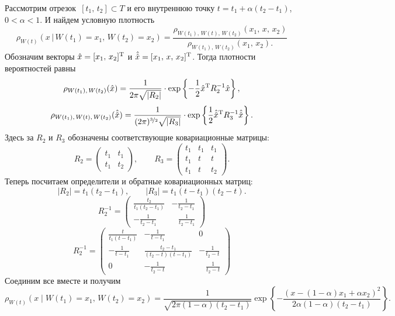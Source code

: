 Рассмотрим отрезок~$[t_1,\,t_2] \subset T$ и его внутреннюю точку $t = t_1 + \alpha(t_2 - t_1)$, $0 < \alpha < 1$. И найдем условную плотность
$$
        \rho_{W(t)}(x\,|\,W(t_1) = x_1,\, W(t_2) = x_2)
=
        \frac{
\rho_{W(t_1),\,W(t),\,W(t_2)}(x_1,\,x,\,x_2)
        }{
\rho_{W(t_1),\,W(t_2)}(x_1,\,x_2).
        }
$$
Обозначим векторы $\hat x = [x_1,\,x_2]^{\mathrm{T}}$ и $\hat{\hat x} = [x_1,\,x,\,x_2]^{\mathrm{T}}$. Тогда плотности вероятностей равны
$$
        \rho_{W(t_1),\,W(t_2)}(\hat x)
=
        \frac{1}{2\pi\sqrt{|R_2|}}\cdot \exp\left\{-\frac12 \hat x^{\mathrm{T}} R_2^{-1} \hat x\right\},
$$
$$
        \rho_{W(t_1),\,W(t),\,W(t_2)}(\hat{\hat x}) = \frac{1}{(2\pi)^{\nicefrac{3}{2}}\sqrt{|R_3|}}\cdot\exp\left\{\frac12 \hat{\hat x}^{\mathrm{T}} R_3^{-1}\hat{\hat x}\right\}.
$$
Здесь за $R_2$ и $R_3$ обозначены соответствующие ковариационные матрицы:
$$
        R_2 = \begin{pmatrix}
        t_1 & t_1 \\
        t_1 & t_2
        \end{pmatrix},
        \qquad
        R_3 = \begin{pmatrix}
                t_1 & t_1 & t_1 \\
                t_1 & t   & t   \\
                t_1 & t   & t_2
        \end{pmatrix}
        .
$$
Теперь посчитаем определители и обратные ковариационных матриц:
$$
        |R_2|
=
        t_1
        (t_2 - t_1),
\qquad
        |R_3|
=
        t_1
        (t - t_1)
        (t_2 - t).
$$
$$
        R_2^{-1}
=
        \begin{pmatrix}
\frac
  {t_2}
  {t_1
   (t_2 - t_1)}
        &
-
\frac
  {1}
  {t_2 - t_1}
        \\
-
\frac
  {1}
  {t_2 - t_1}
        &
\;\;\;
\frac
  {1}
  {t_2 - t_1}
        \end{pmatrix}
$$
$$
        R_2^{-1}
=
        \begin{pmatrix}
\frac
  {t}
  {t_1
   (t - t_1)}
        &
-
\frac
  {1}
  {t - t_1}
        &
0
        \\
-
\frac
  {1}
  {t - t_1}
        &
\frac
  {t_2 - t_1}
  {(t_2 - t)
   (t - t_1)}
        &
-
\frac
  {1}
  {t_2 - t}
        \\
0
        &
-
\frac
  {1}
  {t_2 - t}
        &
\;\;\;
\frac
  {1}
  {t_2 - t}
        \end{pmatrix}  
$$
Соединим все вместе и получим
$$
        \rho_{W(t)}
        (
          x
          \;|\;
          W(t_1) = x_1
          ,\,
          W(t_2) = x_2
        )
=
        \frac
          {
            1
          }
          {
            \sqrt{
              2
              \pi
              (1 - \alpha)
              (t_2 - t_1)
            }
          }
        \exp
        \left\{
          -
          \frac
          {
            (
              x
              -
              (1 - \alpha) x_1
              +
              \alpha x_2
            )^2
          }
          {
            2
            \alpha
            (1 - \alpha)
            (t_2 - t_1)
          }
        \right\}.
$$


